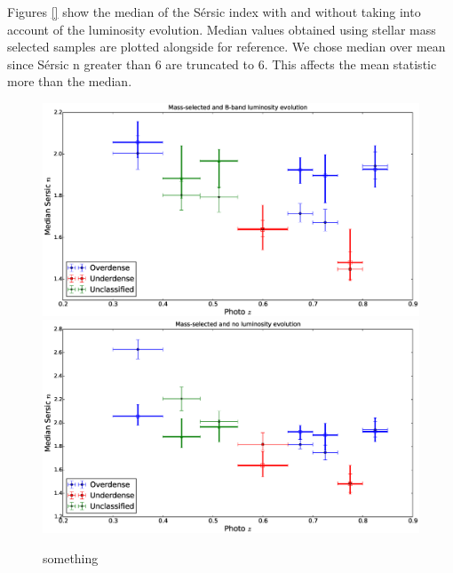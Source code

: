 \documentclass[twocolumn,useAMS,usenatbib]{mn2e}
\newcommand{\sersic}{S\'{e}rsic }
\begin{document}
Figures \ref{} show the median of the \sersic index with and without taking into account of the luminosity evolution. Median values obtained using stellar mass selected samples are plotted alongside for reference.
We chose median over mean since \sersic n greater than 6 are truncated to 6. This affects the mean statistic more than the median.
\begin{figure}
 \centering
 \includegraphics[width=\columnwidth]{median_sersicn}
 \includegraphics[width=\columnwidth]{median_sersicn(2)}
 \caption{something}
 \label{fig:median_sersicn}
\end{figure}
\end{document}
